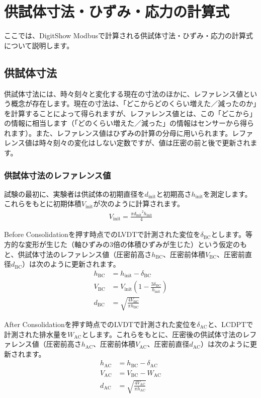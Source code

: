 \section{供試体寸法・ひずみ・応力の計算式}
ここでは、DigitShow Modbusで計算される供試体寸法・ひずみ・応力の計算式について説明します。

\subsection{供試体寸法}
供試体寸法には、時々刻々と変化する現在の寸法のほかに、レファレンス値という概念が存在します。現在の寸法は、「どこからどのくらい増えた／減ったのか」を計算することによって得られますが、レファレンス値とは、この「どこから」の情報に相当します（「どのくらい増えた／減った」の情報はセンサーから得られます）。また、レファレンス値はひずみの計算の分母に用いられます。レファレンス値は時々刻々の変化はしない定数ですが、値は圧密の前と後で更新されます。

\subsubsection{供試体寸法のレファレンス値}
試験の最初に、実験者は供試体の初期直径を$d_\mathrm{init}$と初期高さ$h_\mathrm{init}$を測定します。これらをもとに初期体積$V_\mathrm{init}$が次のように計算されます。
\begin{align}
    V_\mathrm{init} = \frac{\pi{d_\mathrm{init}}^2h_\mathrm{init}}{4}
\end{align}

Before Consolidationを押す時点でのLVDTで計測された変位を$\delta_\mathrm{BC}$とします。等方的な変形が生じた（軸ひずみの3倍の体積ひずみが生じた）という仮定のもと、供試体寸法のレファレンス値（圧密前高さ$h_\mathrm{BC}$、圧密前体積$V_\mathrm{BC}$、圧密前直径$d_\mathrm{BC}$）は次のように更新されます。
\begin{align}
    h_\mathrm{BC} &= h_\mathrm{init} - \delta_\mathrm{BC} \\
    V_\mathrm{BC} &= V_\mathrm{init} \left(1 - \frac{3\delta_\mathrm{BC}}{h_\mathrm{init}}\right) \\
    d_\mathrm{BC} &= \sqrt{\frac{4V_\mathrm{BC}}{\pi h_\mathrm{BC}}}
\end{align}

After Consolidationを押す時点でのLVDTで計測された変位を$\delta_\mathrm{AC}$と、LCDPTで計測された排水量を$W_\mathrm{AC}$とします。これらをもとに、圧密後の供試体寸法のレファレンス値（圧密前高さ$h_\mathrm{AC}$、圧密前体積$V_\mathrm{AC}$、圧密前直径$d_\mathrm{AC}$）は次のように更新されます。
\begin{align}
    h_\mathrm{AC} &= h_\mathrm{BC} - \delta_\mathrm{AC} \\
    V_\mathrm{AC} &= V_\mathrm{BC} - W_\mathrm{AC} \\
    d_\mathrm{AC} &= \sqrt{\frac{4V_\mathrm{AC}}{\pi h_\mathrm{AC}}}
\end{align}

